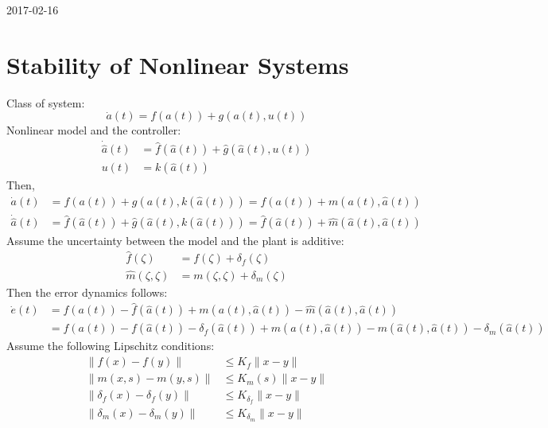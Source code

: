 \documentclass{article}
\begin{document}
\large
2017-02-16
\section{Stability of Nonlinear Systems}
Class of system:
\begin{equation}
	\dot{a}(t) = f(a(t)) + g(a(t), u(t))
\end{equation}
Nonlinear model and the controller:
\begin{equation}
	\begin{aligned}
		\dot{\hat{a}}(t) &= \hat{f}(\hat{a}(t)) + \hat{g}(\hat{a}(t), u(t))\\
		u(t) &= k(\hat{a}(t))
	\end{aligned}
\end{equation}
Then,
\begin{equation}
	\begin{aligned}
		\dot{a}(t) &= f(a(t)) + g(a(t), k(\hat{a}(t))) = f(a(t)) + m(a(t), \hat{a}(t))\\
		\dot{\hat{a}}(t) &= \hat{f}(\hat{a}(t)) + \hat{g}(\hat{a}(t), k(\hat{a}(t))) = \hat{f}(\hat{a}(t)) + \hat{m}(\hat{a}(t), \hat{a}(t))
	\end{aligned}
\end{equation}
Assume the uncertainty between the model and the plant is additive:
\begin{equation}
	\begin{aligned}
		\hat{f}(\zeta) &= f(\zeta) + \delta_f(\zeta)\\
		\hat{m}(\zeta, \zeta) &= m(\zeta, \zeta) + \delta_m(\zeta)
	\end{aligned}
\end{equation}
Then the error dynamics follows:
\begin{equation}
	\begin{aligned}
		\dot{e}(t) &= f(a(t)) - \hat{f}(\hat{a}(t)) + m(a(t), \hat{a}(t)) - \hat{m}(\hat{a}(t), \hat{a}(t))\\
				&= f(a(t)) - f(\hat{a}(t)) - \delta_f(\hat{a}(t)) + m(a(t), \hat{a}(t)) - m(\hat{a}(t), \hat{a}(t)) - \delta_m(\hat{a}(t))
	\end{aligned}
\end{equation}
Assume the following Lipschitz conditions:
\begin{equation}
	\begin{aligned}
		\|f(x) - f(y)\| &\leq K_f\|x - y\|\\
		\|m(x, s) - m(y, s)\| &\leq K_m(s)\|x - y\|\\
		\|\delta_f(x) - \delta_f(y)\| &\leq K_{\delta_f}\|x - y\|\\
		\|\delta_m(x) - \delta_m(y)\| &\leq K_{\delta_m}\|x - y\|
	\end{aligned}
\end{equation}
\end{document}
